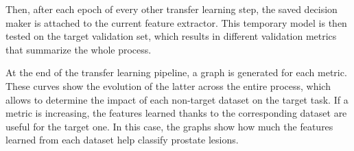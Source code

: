 Then, after each epoch of every other transfer learning step, the saved decision maker is attached to the current feature extractor. This temporary model is then tested on the target validation set, which results in different validation metrics that summarize the whole process.

At the end of the transfer learning pipeline, a graph is generated for each metric. These curves show the evolution of the latter across the entire process, which allows to determine the impact of each non-target dataset on the target task. If a metric is increasing, the features learned thanks to the corresponding dataset are useful for the target one. In this case, the graphs show how much the features learned from each dataset help classify prostate lesions. 

%
%
%


